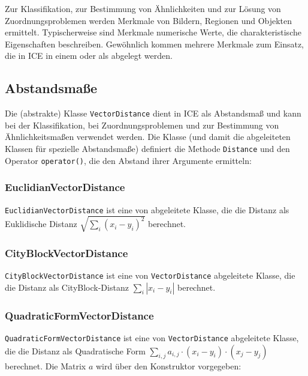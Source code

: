\label{Merkmale}

Zur Klassifikation, zur Bestimmung von Ähnlichkeiten und zur Lösung von 
Zuordnungsproblemen werden Merkmale von Bildern, Regionen und Objekten 
ermittelt. Typischerweise sind Merkmale numerische Werte, die 
charakteristische Eigenschaften beschreiben. Gewöhnlich kommen
mehrere Merkmale zum Einsatz, die in ICE in einem  
oder als  abgelegt werden. 

\subsection{Abstandsmaße}
\label{VectorDistance}
Die (abstrakte) Klasse \verb+VectorDistance+ dient in ICE als Abstandsmaß und 
kann bei der Klassifikation, bei Zuordnungsproblemen und zur Bestimmung von 
Ähnlichkeitsmaßen verwendet werden. Die Klasse (und damit die abgeleiteten 
Klassen für spezielle Abstandsmaße) definiert die Methode 
\verb+Distance+ und den Operator \verb+operator()+, die den Abstand ihrer 
Argumente ermitteln:


\subsubsection{EuclidianVectorDistance}
\label{EuclidianVectorDistance}
\verb+EuclidianVectorDistance+ ist eine von  abgeleitete Klasse, die 
die Distanz als Euklidische Distanz $ \sqrt{\sum_{i} (x_{i} - y_{i} )^2} $  berechnet.

\subsubsection{CityBlockVectorDistance}
\label{CityBlockVectorDistance}
\verb+CityBlockVectorDistance+ ist eine von \verb+VectorDistance+ abgeleitete Klasse, die 
die Distanz als CityBlock-Distanz $ \sum_{i} |x_{i} - y_{i}| $  berechnet.

\subsubsection{QuadraticFormVectorDistance}
\label{QuadraticFormVectorDistance}
\verb+QuadraticFormVectorDistance+ ist eine von \verb+VectorDistance+ abgeleitete Klasse, die 
die Distanz als Quadratische Form $ \sum_{i,j} a_{i,j} \cdot (x_{i} - y_{i} ) \cdot (x_{j} - y_{j} ) $  
berechnet. Die Matrix $a$ wird über den Konstruktor vorgegeben:

